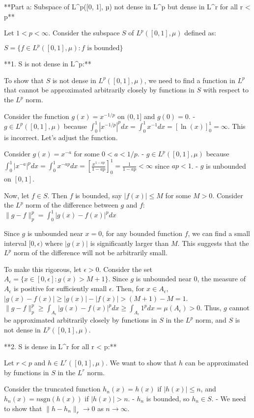 **Part a: Subspace of L^p([0, 1], µ) not dense in L^p but dense in L^r for all r < p**

Let $1 < p < \infty$. Consider the subspace $S$ of $L^p([0, 1], \mu)$ defined as:

$S = \{f \in L^p([0, 1], \mu) : f \text{ is bounded}\}$

**1. S is not dense in L^p:**

To show that $S$ is not dense in $L^p([0, 1], \mu)$, we need to find a function in $L^p$ that cannot be approximated arbitrarily closely by functions in $S$ with respect to the $L^p$ norm.

Consider the function $g(x) = x^{-1/p}$ on $(0, 1]$ and $g(0) = 0$.
- $g \in L^p([0, 1], \mu)$ because $\int_0^1 |x^{-1/p}|^p dx = \int_0^1 x^{-1} dx = [\ln(x)]_0^1 = \infty$. This is incorrect. Let's adjust the function.

Consider $g(x) = x^{-a}$ for some $0 < a < 1/p$.
- $g \in L^p([0, 1], \mu)$ because $\int_0^1 |x^{-a}|^p dx = \int_0^1 x^{-ap} dx = [\frac{x^{1-ap}}{1-ap}]_0^1 = \frac{1}{1-ap} < \infty$ since $ap < 1$.
- $g$ is unbounded on $[0, 1]$.

Now, let $f \in S$. Then $f$ is bounded, say $|f(x)| \le M$ for some $M > 0$. Consider the $L^p$ norm of the difference between $g$ and $f$:
$\|g - f\|_p^p = \int_0^1 |g(x) - f(x)|^p dx$

Since $g$ is unbounded near $x=0$, for any bounded function $f$, we can find a small interval $[0, \epsilon)$ where $|g(x)|$ is significantly larger than $M$. This suggests that the $L^p$ norm of the difference will not be arbitrarily small.

To make this rigorous, let $\epsilon > 0$. Consider the set $A_\epsilon = \{x \in [0, \epsilon] : g(x) > M+1\}$. Since $g$ is unbounded near 0, the measure of $A_\epsilon$ is positive for sufficiently small $\epsilon$. Then, for $x \in A_\epsilon$, $|g(x) - f(x)| \ge |g(x)| - |f(x)| > (M+1) - M = 1$.
$\|g - f\|_p^p \ge \int_{A_\epsilon} |g(x) - f(x)|^p dx \ge \int_{A_\epsilon} 1^p dx = \mu(A_\epsilon) > 0$.
Thus, $g$ cannot be approximated arbitrarily closely by functions in $S$ in the $L^p$ norm, and $S$ is not dense in $L^p([0, 1], \mu)$.

**2. S is dense in L^r for all r < p:**

Let $r < p$ and $h \in L^r([0, 1], \mu)$. We want to show that $h$ can be approximated by functions in $S$ in the $L^r$ norm.

Consider the truncated function $h_n(x) = h(x)$ if $|h(x)| \le n$, and $h_n(x) = n \text{sgn}(h(x))$ if $|h(x)| > n$.
- $h_n$ is bounded, so $h_n \in S$.
- We need to show that $\|h - h_n\|_r \to 0$ as $n \to \infty$.

